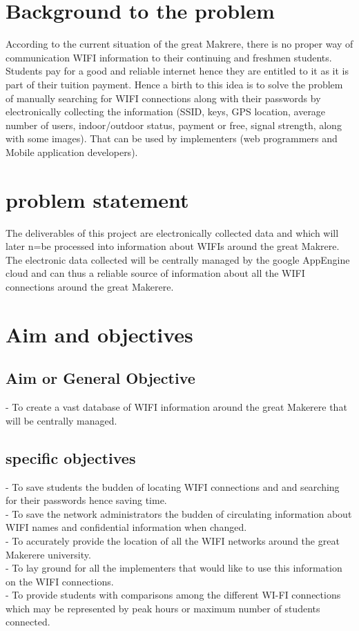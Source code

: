 \documentclass[14pt, a4paper]{article}
\begin{document}
			\section{Background to the problem}
According to the current situation of the great Makrere, there is no proper way of communication WIFI information to their continuing and freshmen students. Students pay for a good and reliable internet hence they are entitled to it as it is part of their tuition payment. Hence a birth to this idea is to solve the problem of manually searching for WIFI connections along with their passwords by electronically collecting the information (SSID, keys, GPS location, average number of users, indoor/outdoor status, payment or free, signal strength, along with some images). That can be used by implementers (web programmers and Mobile application developers).
 

				
			\section{problem statement}
The deliverables of this project are electronically collected data and which will later n=be processed into information  about WIFIs around the great Makrere. The electronic data collected will be centrally managed by the google AppEngine cloud and can thus a reliable source of information about all the WIFI connections around the great Makerere.
			
			
			
			\section{Aim and objectives}
			
				\subsection{Aim or General Objective}
- To create a vast database of WIFI information around the great Makerere that will be centrally managed.

		
		
				
				\subsection{specific objectives}
-	To save students the budden of locating WIFI connections and and searching for their passwords hence saving time.\\
-	To save the network administrators the budden of circulating information about WIFI names and confidential information when changed.\\
-	To accurately provide the location of all the WIFI networks around the great Makerere university.\\
-	To lay ground for all the implementers that would like to use this information on the WIFI connections.\\
-	To provide students with comparisons among the different WI-FI connections which may be represented by peak hours or maximum number of students connected.\\
\end{document}
